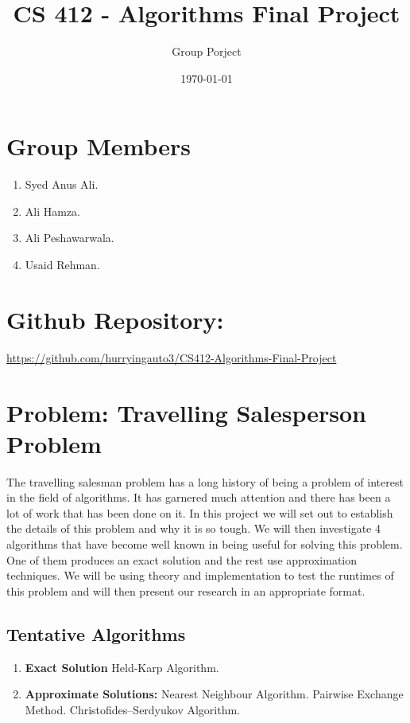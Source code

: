 \documentclass{article}
\title{CS 412 - Algorithms Final Project}
\author{Group Porject}
\date{\today}
\begin{document}
    \maketitle
\section{Group Members}
\begin{enumerate}
    \item Syed Anus Ali.
    \item Ali Hamza.
    \item Ali Peshawarwala.
    \item Usaid Rehman.
\end{enumerate}
\section{Github Repository:}
\begin{flushleft}
\url{https://github.com/hurryingauto3/CS412-Algorithms-Final-Project}
\end{flushleft}

\section{Problem: Travelling Salesperson Problem}
The travelling salesman problem has a long history of being a problem of interest in the field of algorithms. It has garnered much attention and there has been a lot of work that has been done on it. In this project we will set out to establish the details of this problem and why it is so tough. We will then investigate 4 algorithms that have become well known in being useful for solving this problem. One of them produces an exact solution and the rest use approximation techniques. We will be using theory and implementation to test the runtimes of this problem and will then present our research in an appropriate format.

\subsection{Tentative Algorithms}
\begin{enumerate}
	\item \textbf{Exact Solution}
		\subitem Held-Karp Algorithm.
	\item \textbf{ Approximate Solutions:}
		\subitem Nearest Neighbour Algorithm.
		\subitem Pairwise Exchange Method.
		\subitem Christofides–Serdyukov Algorithm.
\end{enumerate}
\newpage
\end{document}

